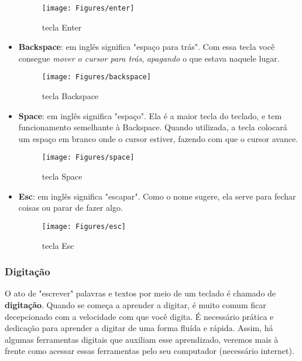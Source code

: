 \documentclass[hidelinks,12pt]{article}
\begin{document}
\begin{itemize}
{	\begin{figure}[!h]
	    \centering
		\texttt{[image: Figures/enter]}
		\label{fig:enter}
		\caption{tecla Enter}
	\end{figure}
	}

	\item { \textbf{Backspace}: em inglês significa "espaço para trás". Com essa tecla você consegue \emph{mover o cursor para trás}, \emph{apagando} o que estava naquele lugar.
	
    \begin{figure}[!h]
	    \centering
		\texttt{[image: Figures/backspace]}
		\label{fig:backspace}
		\caption{tecla Backspace}
	\end{figure}
	}

	\item { \textbf{Space}: em inglês significa "espaço". Ela é a maior tecla do teclado, e tem funcionamento semelhante à Backspace. Quando utilizada, a tecla colocará um espaço em branco onde o cursor estiver, fazendo com que o cursor avance.
    
    \begin{figure}[!h]
	    \centering
		\texttt{[image: Figures/space]}
		\label{fig:space}
		\caption{tecla Space}
	\end{figure}
	}

	\item { \textbf{Esc}: em inglês significa "escapar". Como o nome sugere, ela serve para fechar coisas ou parar de fazer algo.
	
	\begin{figure}[!h]
	    \centering
		\texttt{[image: Figures/esc]}
		\label{fig:esc}
		\caption{tecla Esc}
	\end{figure}
	}

\end{itemize}


\subsubsection{Digitação}

O ato de "escrever" palavras e textos por meio de um teclado é chamado de \textbf{digitação}. Quando se começa a aprender a digitar, é muito comum ficar decepcionado com a velocidade com que você digita. É necessário  prática e dedicação para aprender a digitar de uma forma fluída e rápida. Assim, há algumas ferramentas digitais que auxiliam esse aprendizado, veremos mais à frente como acessar essas ferramentas pelo seu computador (necessário internet).
\end{document}
